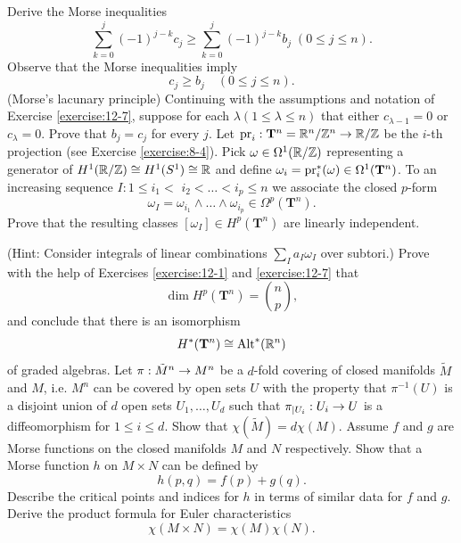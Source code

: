 \begin{enumerate}[label=\theexercise.\arabic*.,ref=\theexercise.\arabic*,leftmargin=2.7em]
    Derive the Morse inequalities
    \[
      \sum_{{k = 0}}^{j}{(-1) }^{j- k}{c}_{j} \geq  \sum_{{k = 0}}^{j}{(-1) }^{j- k}{b}_{j}\;( {0 \leq  j \leq  n}).
    \]
    Observe that the Morse inequalities imply
    \[
      {c}_{j} \geq  {b}_{j}\quad( {0 \leq  j \leq  n}).
    \]
  \NewItem (Morse's lacunary principle) Continuing with the assumptions and notation of Exercise \ref{exercise:12-7}, suppose for each $\lambda ( {1 \leq  \lambda  \leq  n})$ that either ${c}_{\lambda - 1} = 0$ or ${c}_{\lambda } = 0$. Prove that ${b}_{j} = {c}_{j}$ for every $j$.
  \NewItem Let ${\mathrm{pr}}_{i} : {\mathbf{T}}^{n} = {\mathbb{R}}^{n}/{\mathbb{Z}}^{n} \rightarrow  \mathbb{R}/\mathbb{Z}$ be the $i$-th projection (see Exercise \ref{exercise:8-4}). Pick $\omega  \in  {\Omega }^{1}( {\mathbb{R}/\mathbb{Z}})$ representing a generator of ${H}^{1}( {\mathbb{R}/\mathbb{Z}})  \cong  {H}^{1}( {S}^{1})  \cong  \mathbb{R}$ and define ${\omega }_{i} = {\mathrm{pr}}_{i}^*( \omega )  \in  {\Omega }^{1}( {\mathbf{T}}^{n})$. To an increasing sequence $I : 1 \leq  {i}_{1} <$  ${i}_{2} < \ldots  < {i}_{p} \leq  n$ we associate the closed $p$-form
    \[
      {\omega }_{I} = {\omega }_{{i}_{1}} \land  \ldots  \land  {\omega }_{{i}_{p}} \in  {\Omega }^{p}( {\mathbf{T}}^{n}).
    \]
    Prove that the resulting classes $[  {\omega }_{I}]   \in  {H}^{p}( {\mathbf{T}}^{n})$ are linearly independent. \par(Hint: Consider integrals of linear combinations $\sum_{I}{a}_{I}{\omega }_{I}$ over subtori.)
    Prove with the help of Exercises \ref{exercise:12-1} and \ref{exercise:12-7} that
    \[
      \dim {H}^{p}( {\mathbf{T}}^{n})  = \binom{n}{p},
    \]
    and conclude that there is an isomorphism
    \[
      {H}^*( {\mathbf{T}}^{n})  \cong  {\operatorname{Alt}}^*( {\mathbb{R}}^{n})
    \]
    of graded algebras.
  \NewItem Let $\pi: {\tilde{M}}^{n} \rightarrow  {M}^{n}$ be a $d$-fold covering of closed manifolds $\tilde{M}$ and $M$, i.e. ${M}^{n}$ can be covered by open sets $U$ with the property that ${\pi }^{-1}( U)$ is a disjoint union of $d$ open sets ${U}_{1},\ldots,{U}_{d}$ such that ${\pi }_{\mid {U}_{i}} : {U}_{i} \rightarrow  U$ is a diffeomorphism for $1 \leq  i \leq  d$. Show that $\chi ( \tilde{M})  = {d\chi }( M)$.
  \NewItem Assume $f$ and $g$ are Morse functions on the closed manifolds $M$ and $N$ respectively. Show that a Morse function $h$ on $M \times  N$ can be defined by
    \[
      h( {p,q})  = f( p)  + g( q).
    \]
    Describe the critical points and indices for $h$ in terms of similar data for $f$ and $g$. Derive the product formula for Euler characteristics
    \[
      \chi ( {M \times  N})  = \chi ( M) \chi ( N).
\]
\end{enumerate}
